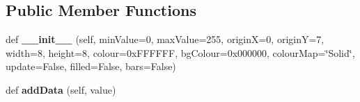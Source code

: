 \subsection*{Public Member Functions}
\begin{DoxyCompactItemize}
\item 
\mbox{\label{classglowbit_1_1glowbitMatrix_1_1graph2D_a9dca41564c692bdc30b8f6603aa66943}} 
def {\bfseries \+\_\+\+\_\+init\+\_\+\+\_\+} (self, min\+Value=0, max\+Value=255, originX=0, originY=7, width=8, height=8, colour=0x\+F\+F\+F\+F\+F\+F, bg\+Colour=0x000000, colour\+Map=\char`\"{}\+Solid\char`\"{}, update=\+False, filled=\+False, bars=\+False)
\item 
\mbox{\label{classglowbit_1_1glowbitMatrix_1_1graph2D_a90174fcc78c97dd0dcaf42d97e467116}} 
def {\bfseries add\+Data} (self, value)
\end{DoxyCompactItemize}
